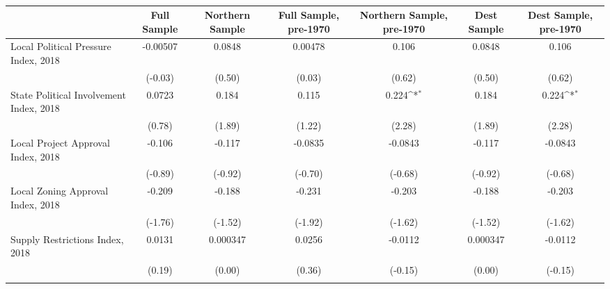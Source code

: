 \begin{table}[htbp]\centering
\def\sym#1{\ifmmode^{#1}\else\(^{#1}\)\fi}
\caption{ \label{tab1}}
\begin{tabular}{l*{6}{c}}
\toprule
                    &\multicolumn{1}{c}{Full Sample}&\multicolumn{1}{c}{Northern Sample}&\multicolumn{1}{c}{Full Sample, pre-1970}&\multicolumn{1}{c}{Northern Sample, pre-1970}&\multicolumn{1}{c}{Dest Sample}&\multicolumn{1}{c}{Dest Sample, pre-1970}\\
\midrule
Local Political Pressure Index, 2018&    -0.00507         &      0.0848         &     0.00478         &       0.106         &      0.0848         &       0.106         \\
                    &     (-0.03)         &      (0.50)         &      (0.03)         &      (0.62)         &      (0.50)         &      (0.62)         \\
\addlinespace
State Political Involvement Index, 2018&      0.0723         &       0.184         &       0.115         &       0.224\sym{*}  &       0.184         &       0.224\sym{*}  \\
                    &      (0.78)         &      (1.89)         &      (1.22)         &      (2.28)         &      (1.89)         &      (2.28)         \\
\addlinespace
Local Project Approval Index, 2018&      -0.106         &      -0.117         &     -0.0835         &     -0.0843         &      -0.117         &     -0.0843         \\
                    &     (-0.89)         &     (-0.92)         &     (-0.70)         &     (-0.68)         &     (-0.92)         &     (-0.68)         \\
\addlinespace
Local Zoning Approval Index, 2018&      -0.209         &      -0.188         &      -0.231         &      -0.203         &      -0.188         &      -0.203         \\
                    &     (-1.76)         &     (-1.52)         &     (-1.92)         &     (-1.62)         &     (-1.52)         &     (-1.62)         \\
\addlinespace
Supply Restrictions Index, 2018&      0.0131         &    0.000347         &      0.0256         &     -0.0112         &    0.000347         &     -0.0112         \\
                    &      (0.19)         &      (0.00)         &      (0.36)         &     (-0.15)         &      (0.00)         &     (-0.15)         \\
\addlinespace

\end{tabular}
\end{table}

